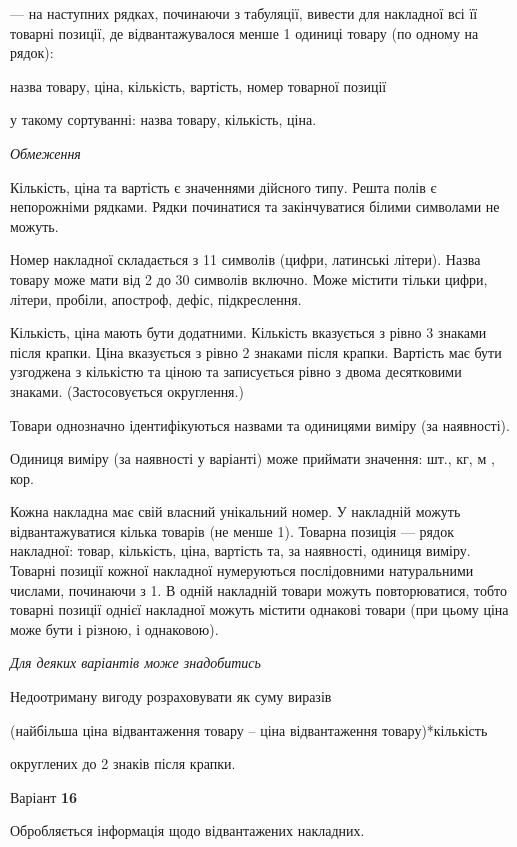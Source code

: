 \documentclass[11pt, ukrainian]{article}
\begin{document}
{\noindent}--- на наступних рядках, починаючи з табуляції, вивести для накладної всі її товарні позиції, де відвантажувалося менше 1 одиниці товару (по одному на рядок):\par
назва товару, ціна, кількість, вартість, номер товарної позиції

{\noindent}у такому сортуванні: назва товару, кількість, ціна.


\bigskip\textit{Обмеження}

Кількість, ціна та вартість є значеннями дійсного типу.
Решта полів є непорожніми рядками.
Рядки починатися та закінчуватися білими символами не можуть.

Номер накладної складається з 11 символів (цифри, латинські літери).
Назва товару може мати від 2 до 30 символів включно.
Може містити тільки цифри, літери, пробіли, апостроф, дефіс, підкреслення.

Кількість, ціна мають бути додатними.
Кількість вказується з рівно 3 знаками після крапки.
Ціна вказується з рівно 2 знаками після крапки.
Вартість має бути узгоджена з кількістю та ціною та записується рівно з двома десятковими знаками.
(Застосовується округлення.)

Товари однозначно ідентифікуються назвами та одиницями виміру (за наявності).

Одиниця виміру (за наявності у варіанті) може приймати значення: шт., кг, м , кор.

Кожна накладна має свій власний унікальний номер.
У накладній можуть відвантажуватися кілька товарів (не менше 1).
Товарна позиція --- рядок накладної: товар, кількість, ціна, вартість та, за наявності, одиниця виміру.
Товарні позиції кожної накладної нумеруються послідовними натуральними числами, починаючи з 1.
В одній накладній товари можуть повторюватися, 
тобто товарні позиції однієї накладної можуть містити однакові товари 
(при цьому ціна може бути і різною, і однаковою).

\bigskip\textit{Для деяких варіантів може знадобитись}

Недоотриману вигоду розраховувати як суму виразів
{\center (найбільша ціна відвантаження товару – ціна відвантаження товару)*кількість\par}

\bigskip
{\noindent} округлених до 2 знаків після крапки.


\par
\newpage
{\center Варіант  \No \textbf { 16 }\par}
\bigskip
Обробляється інформація щодо відвантажених накладних.
\end{document}
